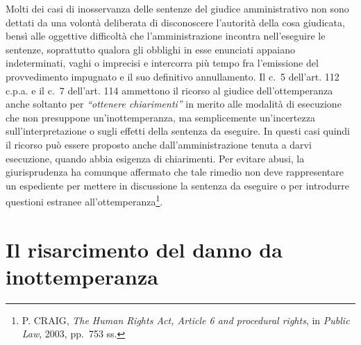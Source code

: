 \documentclass[12pt,it,a4paper,]{report}
\begin{document}
Molti dei casi di inosservanza delle sentenze del giudice amministrativo
non sono dettati da una volontà deliberata di disconoscere l'autorità
della cosa giudicata, bensì alle oggettive difficoltà che
l'amministrazione incontra nell'eseguire le sentenze, soprattutto
qualora gli obblighi in esse enunciati appaiano indeterminati, vaghi o
imprecisi e intercorra più tempo fra l'emissione del provvedimento
impugnato e il suo definitivo annullamento. Il c.~5 dell'art. 112 c.p.a.
e il c.~7 dell'art. 114 ammettono il ricorso al giudice
dell'ottemperanza anche soltanto per \emph{``ottenere chiarimenti''} in
merito alle modalità di esecuzione che non presuppone un'inottemperanza,
ma semplicemente un'incertezza sull'interpretazione o sugli effetti
della sentenza da eseguire. In questi casi quindi il ricorso può essere
proposto anche dall'amministrazione tenuta a darvi esecuzione, quando
abbia esigenza di chiarimenti. Per evitare abusi, la giurisprudenza ha
comunque affermato che tale rimedio non deve rappresentare un espediente
per mettere in discussione la sentenza da eseguire o per introdurre
questioni estranee all'ottemperanza\footnote{P. CRAIG, \emph{The Human
  Rights Act, Article 6 and procedural rights}, in \emph{Public Law},
  2003, pp.~753 ss.}.

\hypertarget{il-risarcimento-del-danno-da-inottemperanza}{%
\section{Il risarcimento del danno da
inottemperanza}\label{il-risarcimento-del-danno-da-inottemperanza}}
\end{document}
